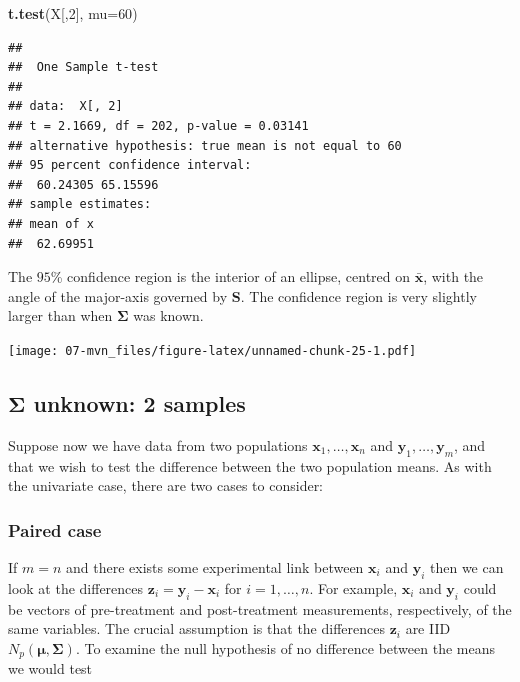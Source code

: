 \documentclass[
]{book}
\newenvironment{Shaded}{\begin{snugshade}}{\end{snugshade}}
\newcommand{\AttributeTok}[1]{\textcolor[rgb]{0.13,0.29,0.53}{#1}}
\newcommand{\DecValTok}[1]{\textcolor[rgb]{0.00,0.00,0.81}{#1}}
\newcommand{\FunctionTok}[1]{\textcolor[rgb]{0.13,0.29,0.53}{\textbf{#1}}}
\newcommand{\NormalTok}[1]{#1}
\theoremstyle{definition}
\theoremstyle{definition}
\theoremstyle{definition}
\theoremstyle{definition}
\theoremstyle{remark}
\begin{document}
\begin{Shaded}
\begin{Highlighting}[]
\FunctionTok{t.test}\NormalTok{(X[,}\DecValTok{2}\NormalTok{], }\AttributeTok{mu=}\DecValTok{60}\NormalTok{)}
\end{Highlighting}
\end{Shaded}

\begin{verbatim}
## 
##  One Sample t-test
## 
## data:  X[, 2]
## t = 2.1669, df = 202, p-value = 0.03141
## alternative hypothesis: true mean is not equal to 60
## 95 percent confidence interval:
##  60.24305 65.15596
## sample estimates:
## mean of x 
##  62.69951
\end{verbatim}

The \(95\)\% confidence region is the interior of an ellipse, centred on \(\bar{\mathbf x}\), with the angle of the major-axis governed by \(\mathbf S\). The confidence region is very slightly larger than when \(\boldsymbol{\Sigma}\) was known.

\texttt{[image: 07-mvn\_files/figure-latex/unnamed-chunk-25-1.pdf]}

\hypertarget{boldsymbolsigma-unknown-2-samples}{%
\subsection{\texorpdfstring{\(\boldsymbol{\Sigma}\) unknown: 2 samples}{\textbackslash boldsymbol\{\textbackslash Sigma\} unknown: 2 samples}}\label{boldsymbolsigma-unknown-2-samples}}

Suppose now we have data from two populations \(\mathbf x_1, \ldots, \mathbf x_n\) and \(\mathbf y_1,\ldots, \mathbf y_m\), and that we wish to test the difference between the two population means. As with the univariate case, there are two cases to consider:

\hypertarget{paired-case}{%
\subsubsection*{Paired case}\label{paired-case}}

If \(m=n\) and there exists some experimental link between \(\mathbf x_i\) and \(\mathbf y_i\) then we can look at the differences \(\mathbf z_i = \mathbf y_i - \mathbf x_i\) for \(i=1,\ldots,n\). For example, \(\mathbf x_i\) and \(\mathbf y_i\) could be vectors of pre-treatment and post-treatment measurements, respectively, of the same variables. The crucial assumption is that the differences \(\mathbf z_i\) are IID \(N_p({\boldsymbol{\mu}}, \boldsymbol{\Sigma})\). To examine the null hypothesis of no difference between the means we would test
\end{document}
